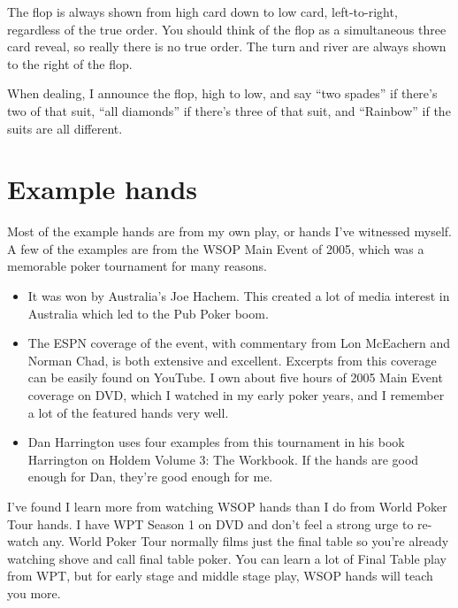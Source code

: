 The flop is always shown from high card down to low card, left-to-right,
regardless of the true order. You should think of the flop as a
simultaneous three card reveal, so really there is no true order. The turn
and river are always shown to the right of the flop.

When dealing, I announce the flop, high to low, and say ``two spades''
if there's two of that suit, ``all diamonds'' if there's three of that
suit, and ``Rainbow'' if the suits are all different.


\section*{Example hands}

Most of the example hands are from my own play, or hands I've
witnessed myself. A few of the examples are from the WSOP Main Event
of 2005, which was a memorable poker tournament for many reasons.

\begin{itemize}
  \item It was won by Australia's Joe Hachem. This created a lot of
    media interest in Australia which led to the Pub Poker boom.
  \item The ESPN coverage of the event, with commentary from
    Lon McEachern and Norman Chad, is both extensive and
    excellent. Excerpts from this coverage can be easily found on
    YouTube. I own about five hours of 2005 Main Event coverage on
    DVD, which I watched in my early poker years, and I remember a lot
    of the featured hands very well.
  \item Dan Harrington uses four examples from this tournament in his
    book Harrington on Holdem Volume 3: The Workbook. If the hands are
    good enough for Dan, they're good enough for me.
\end{itemize}

I've found I learn more from watching WSOP hands than I do
from World Poker Tour hands. I have WPT Season 1 on DVD and don't feel
a strong urge to re-watch any. World Poker Tour normally films just the
final table so you're already watching shove and call final table
poker. You can learn a lot of Final Table play from WPT, but for early
stage and middle stage play, WSOP hands will teach you more.
